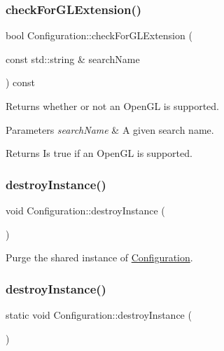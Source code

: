 \subsubsection{\texorpdfstring{check\+For\+G\+L\+Extension()}{checkForGLExtension()}\hspace{0.1cm}{\footnotesize\ttfamily [2/2]}}
{\footnotesize\ttfamily bool Configuration\+::check\+For\+G\+L\+Extension (\begin{DoxyParamCaption}\item[{const std\+::string \&}]{search\+Name }\end{DoxyParamCaption}) const}

Returns whether or not an Open\+GL is supported.


\begin{DoxyParams}{Parameters}
{\em search\+Name} & A given search name. \\
\hline
\end{DoxyParams}
\begin{DoxyReturn}{Returns}
Is true if an Open\+GL is supported. 
\end{DoxyReturn}
\mbox{\label{classConfiguration_acbc9e73d16e5eb122e7daef71c955cf2}} 
\subsubsection{\texorpdfstring{destroy\+Instance()}{destroyInstance()}\hspace{0.1cm}{\footnotesize\ttfamily [1/2]}}
{\footnotesize\ttfamily void Configuration\+::destroy\+Instance (\begin{DoxyParamCaption}{ }\end{DoxyParamCaption})\hspace{0.3cm}{\ttfamily [static]}}

Purge the shared instance of \hyperlink{classConfiguration}{Configuration}. \mbox{\label{classConfiguration_a223669fddc7b1c797c61907129b3674e}} 
\subsubsection{\texorpdfstring{destroy\+Instance()}{destroyInstance()}\hspace{0.1cm}{\footnotesize\ttfamily [2/2]}}
{\footnotesize\ttfamily static void Configuration\+::destroy\+Instance (\begin{DoxyParamCaption}{ }\end{DoxyParamCaption})\hspace{0.3cm}{\ttfamily [static]}}

